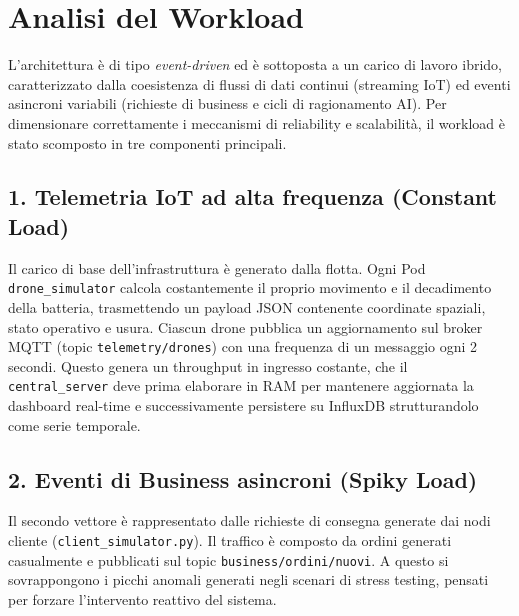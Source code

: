 \section{Analisi del Workload}
\label{sec:analisi_workload}

L'architettura è di tipo \textit{event-driven} ed è sottoposta a un carico di lavoro ibrido, caratterizzato dalla coesistenza di flussi di dati continui (streaming IoT) ed eventi asincroni variabili (richieste di business e cicli di ragionamento AI). Per dimensionare correttamente i meccanismi di reliability e scalabilità, il workload è stato scomposto in tre componenti principali.

\subsection*{1. Telemetria IoT ad alta frequenza (Constant Load)}
Il carico di base dell'infrastruttura è generato dalla flotta. Ogni Pod \texttt{drone\_simulator} calcola costantemente il proprio movimento e il decadimento della batteria, trasmettendo un payload JSON contenente coordinate spaziali, stato operativo e usura. Ciascun drone pubblica un aggiornamento sul broker MQTT (topic \texttt{telemetry/drones}) con una frequenza di un messaggio ogni 2 secondi. Questo genera un throughput in ingresso costante, che il \texttt{central\_server} deve prima elaborare in RAM per mantenere aggiornata la dashboard real-time e successivamente persistere su InfluxDB strutturandolo come serie temporale.

\subsection*{2. Eventi di Business asincroni (Spiky Load)}
Il secondo vettore è rappresentato dalle richieste di consegna generate dai nodi cliente (\texttt{client\_simulator.py}). Il traffico è composto da ordini generati casualmente e pubblicati sul topic \texttt{business/ordini/nuovi}. A questo si sovrappongono i picchi anomali generati negli scenari di stress testing, pensati per forzare l'intervento reattivo del sistema.


